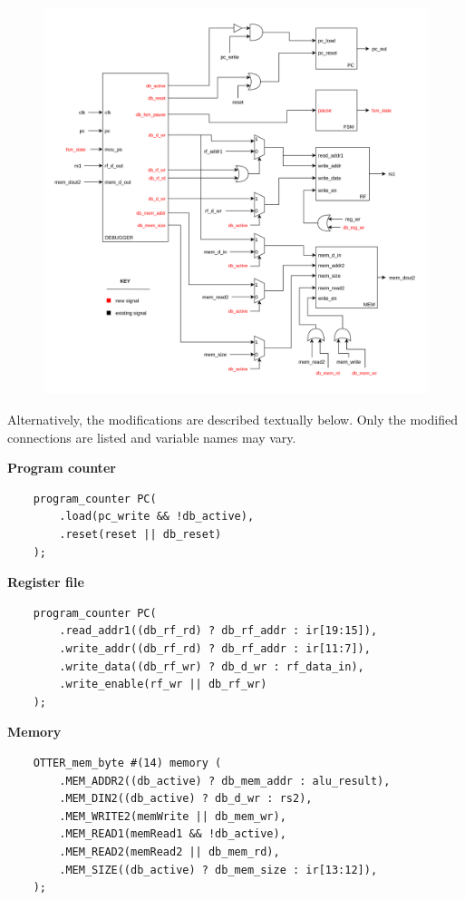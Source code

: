 \documentclass[10pt,a4paper]{article}
\begin{document}
\bigskip
\begin{figure}[htpb]
    \centering
    \includegraphics[width=\linewidth]{blackbox.png}
\end{figure}

\newpage
Alternatively, the modifications are described textually below. Only the modified connections
are listed and variable names may vary.

\medskip

\textbf{Program counter}
\begin{verbatim}
    program_counter PC(
        .load(pc_write && !db_active),
        .reset(reset || db_reset)
    );
\end{verbatim}

\textbf{Register file}
\begin{verbatim}
    program_counter PC(
        .read_addr1((db_rf_rd) ? db_rf_addr : ir[19:15]),
        .write_addr((db_rf_rd) ? db_rf_addr : ir[11:7]),
        .write_data((db_rf_wr) ? db_d_wr : rf_data_in),
        .write_enable(rf_wr || db_rf_wr)
    );
\end{verbatim}

\textbf{Memory}
\begin{verbatim}
    OTTER_mem_byte #(14) memory (
        .MEM_ADDR2((db_active) ? db_mem_addr : alu_result),
        .MEM_DIN2((db_active) ? db_d_wr : rs2),
        .MEM_WRITE2(memWrite || db_mem_wr),
        .MEM_READ1(memRead1 && !db_active),
        .MEM_READ2(memRead2 || db_mem_rd),
        .MEM_SIZE((db_active) ? db_mem_size : ir[13:12]),
    );
\end{verbatim}
\end{document}

